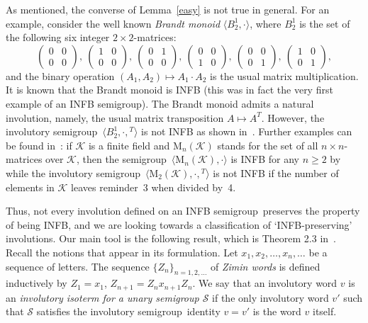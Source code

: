 \documentclass[smallextended]{svjour3}
\newcommand{\sgp}{semi\-group}
\newcommand{\is}{involutory semi\-group}
\begin{document}
As mentioned, the converse of Lemma~\ref{easy} is not true in general. For an example, consider the well known \emph{Brandt monoid}
$\langle B_2^1,\cdot\rangle$, where $B_2^1$ is the set of the following six integer $2\times 2$-matrices:
$$\begin{pmatrix} 0 & 0\\ 0 & 0\end{pmatrix},\
\begin{pmatrix} 1 & 0\\ 0 & 0\end{pmatrix},\
\begin{pmatrix} 0 & 1\\ 0 & 0\end{pmatrix},\
\begin{pmatrix} 0 & 0\\ 1 & 0\end{pmatrix},\
\begin{pmatrix} 0 & 0\\ 0 & 1\end{pmatrix},\
\begin{pmatrix} 1 & 0\\ 0 & 1\end{pmatrix},$$
and the binary operation $(A_1,A_2)\mapsto A_1\cdot A_2$ is the usual matrix multiplication. It is known
\cite[Corollary~6.1]{sapirburnside} that the Brandt monoid is INFB (this was in fact the very first example of an INFB \sgp). The Brandt
monoid admits a natural involution, namely, the usual matrix transposition $A\mapsto A^T$. However, the \is\ $\langle
B_2^1,\cdot,{}^T\rangle$ is not INFB as shown in~\cite{Sapir:1993}. Further examples can be found in~\cite{ADV:2012}: if $\mathcal{K}$ is a
finite field and $\mathrm{M}_n(\mathcal{K})$ stands for the set of all $n\times n$-matrices over $\mathcal{K}$, then the \sgp\
$\langle\mathrm{M}_n(\mathcal{K}),\cdot\rangle$ is INFB for any $n\ge 2$ by \cite[Corollary~6.2]{sapirburnside} while the \is\
$\langle\mathrm{M}_2(\mathcal{K}),\cdot,{}^T\rangle$ is not INFB if the number of elements in $\mathcal{K}$ leaves reminder~3 when divided
by~4.

Thus, not every involution defined on an INFB \sgp\ preserves the property of being INFB, and we are looking towards a classification of
`INFB-preserving' involutions. Our main tool is the following result, which is Theorem 2.3 in~\cite{ADV:2012}. Recall the notions that
appear in its formulation. Let $x_1,x_2,\dots,x_n,\dots$ be a sequence of letters. The sequence $\{Z_n\}_{n=1,2,\dots}$ of \emph{Zimin
words} is defined inductively by $Z_1=x_1$, $Z_{n+1}=Z_nx_{n+1}Z_n$. We say that an involutory word $v$ is an \emph{involutory isoterm for
a unary semigroup $\mathcal{S}$} if the only involutory word $v'$ such that $\mathcal{S}$ satisfies the \is\ identity $v=v'$ is the word
$v$ itself.
\end{document}

